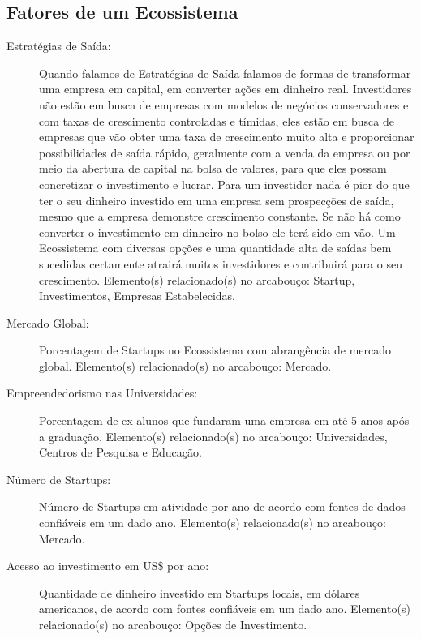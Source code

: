 \begin{apendicesenv}

\partapendices

\chapter{Fatores de um Ecossistema}
\label{apendices:fatores_de_um_ecossistema}

\begin{description}

  \item [Estratégias de Saída:] Quando falamos de Estratégias de Saída falamos de formas de transformar uma empresa em capital, em converter ações em dinheiro real. Investidores não estão em busca de empresas com modelos de negócios conservadores e com taxas de crescimento controladas e tímidas, eles estão em busca de empresas que vão obter uma taxa de crescimento muito alta e proporcionar possibilidades de saída rápido, geralmente com a venda da empresa ou por meio da abertura de capital na bolsa de valores, para que eles possam concretizar o investimento e lucrar. Para um investidor nada é pior do que ter o seu dinheiro investido em uma empresa sem prospecções de saída, mesmo que a empresa demonstre crescimento constante. Se não há como converter o investimento em dinheiro no bolso ele terá sido em vão. Um Ecossistema com diversas opções e uma quantidade alta de saídas bem sucedidas certamente atrairá muitos investidores e contribuirá para o seu crescimento. Elemento(s) relacionado(s) no arcabouço: Startup, Investimentos, Empresas Estabelecidas.

  \item [Mercado Global:] Porcentagem de Startups no Ecossistema com abrangência de mercado global. Elemento(s) relacionado(s) no arcabouço: Mercado.

  \item [Empreendedorismo nas Universidades:] Porcentagem de ex-alunos que fundaram uma empresa em até 5 anos após a graduação. Elemento(s) relacionado(s) no arcabouço: Universidades, Centros de Pesquisa e Educação.

  \item [Número de Startups:] Número de Startups em atividade por ano de acordo com fontes de dados confiáveis em um dado ano. Elemento(s) relacionado(s) no arcabouço: Mercado.

  \item [Acesso ao investimento em US\$ por ano:] Quantidade de dinheiro investido em Startups locais, em dólares americanos, de acordo com fontes confiáveis em um dado ano. Elemento(s) relacionado(s) no arcabouço: Opções de Investimento. 


\end{description}
\end{apendicesenv}

